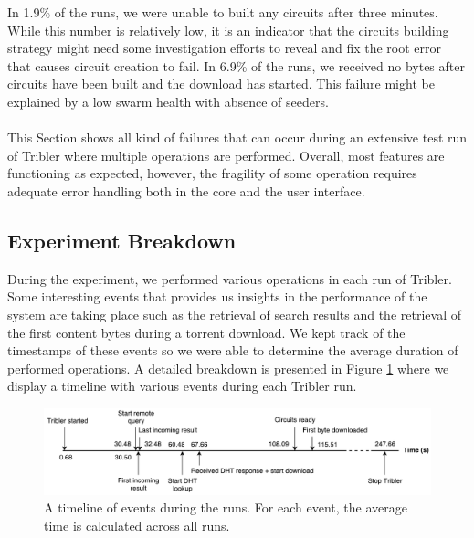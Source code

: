 In 1.9\% of the runs, we were unable to built any circuits after three minutes. While this number is relatively low, it is an indicator that the circuits building strategy might need some investigation efforts to reveal and fix the root error that causes circuit creation to fail. In 6.9\% of the runs, we received no bytes after circuits have been built and the download has started. This failure might be explained by a low swarm health with absence of seeders.\\\\
This Section shows all kind of failures that can occur during an extensive test run of Tribler where multiple operations are performed. Overall, most features are functioning as expected, however, the fragility of some operation requires adequate error handling both in the core and the user interface.

\subsection{Experiment Breakdown}
During the experiment, we performed various operations in each run of Tribler. Some interesting events that provides us insights in the performance of the system are taking place such as the retrieval of search results and the retrieval of the first content bytes during a torrent download. We kept track of the timestamps of these events so we were able to determine the average duration of performed operations. A detailed breakdown is presented in Figure \ref{fig:big-experiment-breakdown} where we display a timeline with various events during each Tribler run.

\begin{figure}[!h]
	\centering
	\includegraphics[width=1.0\columnwidth]{images/big_experiment/big_experiment_breakdown}
	\caption{A timeline of events during the runs. For each event, the average time is calculated across all runs.}
	\label{fig:big-experiment-breakdown}
\end{figure}

